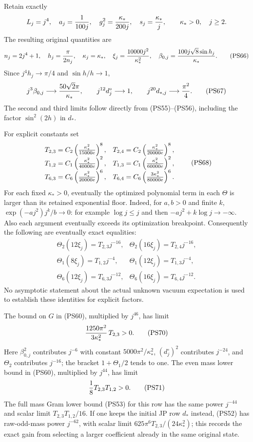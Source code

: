 \documentclass[11pt]{article}
\begin{document}
Retain exactly
\[
 L_j=j^4,\quad a_j={1\over100j},\quad
 g_j^2={\kappa_*\over200j},\quad s_j={\kappa_*\over j},\qquad
 \kappa_*>0,\quad j\ge2.
 \]
The resulting original quantities are
\[
 n_j=2j^4+1,\quad h_j={\pi\over2n_j},\quad
 \kappa_j=\kappa_*,\quad
 \xi_j={10000j^2\over\kappa_*^2},\quad
 \beta_{0,j}={100j\sqrt8\sin h_j\over\kappa_*}.
 \tag{PS66}
\]
Since \(j^4h_j\to\pi/4\) and \(\sin h/h\to1\),
\[
 j^3\beta_{0,j}\longrightarrow {50\sqrt2\pi\over\kappa_*},
 \qquad
 j^{12}d^\circ_j\longrightarrow1,\qquad
 j^{20}d_{*,j}\longrightarrow{\pi^2\over4}.
 \tag{PS67}
\]
The second and third limits follow directly from (PS55)–(PS56),
including the factor \(\sin^2(2h)\) in \(d_*\).

For explicit constants set
\[
 \begin{array}{ll}
 T_{2,3}=C_2\left({\kappa_*^2\over15000e}\right)^8,&
 T_{2,4}=C_2\left({\kappa_*^2\over20000e}\right)^8,\\
 T_{1,2}=C_1\left({\kappa_*^2\over40000e}\right)^2,&
 T_{1,3}=C_1\left({\kappa_*^2\over60000e}\right)^2,\\
 T_{6,3}=C_6\left({\kappa_*^2\over20000e}\right)^6,&
 T_{6,4}=C_6\left({3\kappa_*^2\over80000e}\right)^6 .
 \end{array}
 \tag{PS68}
\]
For each fixed \(\kappa_*>0\), eventually the optimized polynomial
term in each \(\Theta\) is larger than its retained exponential
floor. Indeed, for \(a,b>0\) and finite \(k\),
\(\exp(-aj^2)j^k/b\to0\): for example
\(\log j\le j\) and then \(-aj^2+k\log j\to-\infty\).
Also each argument eventually exceeds its optimization breakpoint.
Consequently the following are eventually exact equalities:
\[
 \begin{array}{ll}
 \Theta_2(12\xi_j)=T_{2,3}j^{-16},&
 \Theta_2(16\xi_j)=T_{2,4}j^{-16},\\
 \Theta_1(8\xi_j)=T_{1,2}j^{-4},&
 \Theta_1(12\xi_j)=T_{1,3}j^{-4},\\
 \Theta_6(12\xi_j)=T_{6,3}j^{-12},&
 \Theta_6(16\xi_j)=T_{6,4}j^{-12}.
 \end{array}
 \tag{PS69}
\]
No asymptotic statement about the actual unknown vacuum expectation
is used to establish these identities for explicit factors.

The bound on \(G\) in (PS60), multiplied by \(j^{46}\), has limit
\[
 {1250\pi^2\over3\kappa_*^2}\,T_{2,3}>0.
 \tag{PS70}
\]
Here \(\beta_{0,j}^2\) contributes \(j^{-6}\) with constant
\(5000\pi^2/\kappa_*^2\), \((d^\circ_j)^2\) contributes
\(j^{-24}\), and \(\Theta_2\) contributes \(j^{-16}\);
the bracket \(1+\Theta_1/2\) tends to one.
The even mass lower bound in (PS60), multiplied by \(j^{44}\),
has limit
\[
 {1\over8}T_{2,3}T_{1,2}>0.
 \tag{PS71}
\]
The full mass Gram lower bound (PS53) for this row has the same
power \(j^{-44}\) and scalar limit \(T_{2,3}T_{1,2}/16\).
If one keeps the initial JP row \(d_*\) instead, (PS52) has
raw-odd-mass power \(j^{-62}\), with scalar limit
\(625\pi^6T_{2,3}/(24\kappa_*^2)\); this records the exact
gain from selecting a larger coefficient already in the same
original state.
\end{document}
